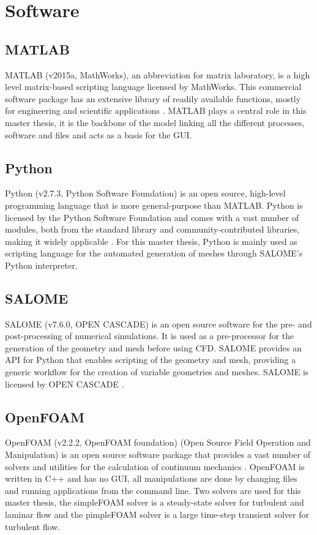 \section{Software}
\subsection{MATLAB}
MATLAB (v2015a, MathWorks), an abbreviation for matrix laboratory, is a high level matrix-based scripting language licensed by MathWorks. This commercial software package has an extensive library of readily available functions, mostly for engineering and scientific applications \citep{MathWorks2016}. MATLAB plays a central role in this master thesis, it is the backbone of the model linking all the different processes, software and files and acts as a basis for the \gls{GUI}.  %

\subsection{Python}
Python (v2.7.3, Python Software Foundation) is an open source, high-level programming language that is more general-purpose than MATLAB. Python is licensed by the Python Software Foundation and comes with a vast number of modules, both from the standard library and community-contributed libraries, making it widely applicable \citep{Foundation2016}. For this master thesis, Python is mainly used as scripting language for the automated generation of meshes through SALOME's Python interpreter.

\subsection{SALOME \label{sec:SALOME}}
SALOME (v7.6.0, OPEN CASCADE) is an open source software for the pre- and post-processing of numerical simulations. It is used as a pre-processor for the generation of the geometry and mesh before using \gls{CFD}. SALOME provides an \gls{API} for Python that enables scripting of the geometry and mesh, providing a generic workflow for the creation of variable geometries and meshes. SALOME is licensed by OPEN CASCADE \citep{Cascade2016}.

\subsection{OpenFOAM \label{sec:OpenFOAM}}
OpenFOAM (v2.2.2, OpenFOAM foundation) (Open Source Field Operation and Manipulation) is an open source software package that provides a vast number of solvers and utilities for the calculation of continuum mechanics \citep{OpenFOAM-Foundation2016}. OpenFOAM is written in C++ and has no \gls{GUI}, all manipulations are done by changing files and running applications from the command line. Two solvers are used for this master thesis, the simpleFOAM solver is a steady-state solver for turbulent and laminar flow and the pimpleFOAM solver is a large time-step transient solver for turbulent flow.
